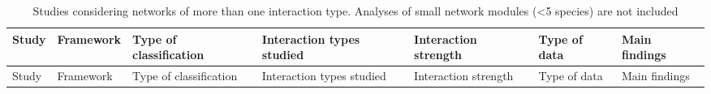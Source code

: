 \begin{landscape}%
\begin{footnotesize}
\begin{longtable}{p{1.5cm}p{1.5cm}p{2cm}p{2cm}p{2cm}p{2cm}p{4cm}}
\caption[Studies of multiple interactions networks]{\color{Gray}Studies considering networks of more than one interaction type. Analyses of small network modules ({\textless}5 species) are not included\label{tab:table1.1}}\\\hline
Study & Framework &  Type of classification & Interaction types studied & Interaction strength  &  Type of data & Main findings\\\hline
\endfirsthead
\hline
Study & Framework &  Type of classification & Interaction types studied & Interaction strength  &  Type of data & Main findings\\\hline
\endhead


\end{longtable}
\end{footnotesize}
\end{landscape}

